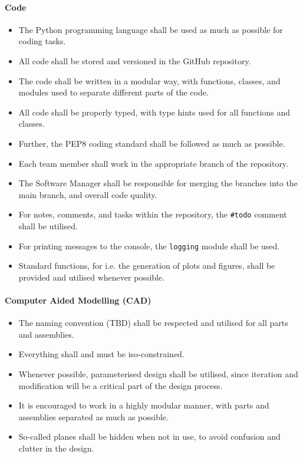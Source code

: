 \paragraph{Code}
\begin{itemize}
    \item The Python programming language shall be used as much as possible for coding tasks.
    \item All code shall be stored and versioned in the GitHub repository.
    \item The code shall be written in a modular way, with functions, classes, and modules used to separate different parts of the code.
    \item All code shall be properly typed, with type hints used for all functions and classes.
    \item Further, the PEP8 coding standard shall be followed as much as possible.
    \item Each team member shall work in the appropriate branch of the repository.
    \item The Software Manager shall be responsible for merging the branches into the main branch, and overall code quality.
    \item For notes, comments, and tasks within the repository, the \verb|#todo| comment shall be utilised.
    \item For printing messages to the console, the \verb|logging| module shall be used.
    \item Standard functions, for i.e\@. the generation of plots and figures, shall be provided and utilised whenever possible.
\end{itemize}

\paragraph{Computer Aided Modelling (CAD)}
\begin{itemize}
    \item The naming convention (TBD) shall be respected and utilised for all parts and assemblies.
    \item Everything shall and must be iso-constrained.
    \item Whenever possible, parameterised design shall be utilised, since iteration and modification will be a critical part of the design process.
    \item It is encouraged to work in a highly modular manner, with parts and assemblies separated as much as possible.
    \item So-called planes shall be hidden when not in use, to avoid confusion and clutter in the design.
\end{itemize}

